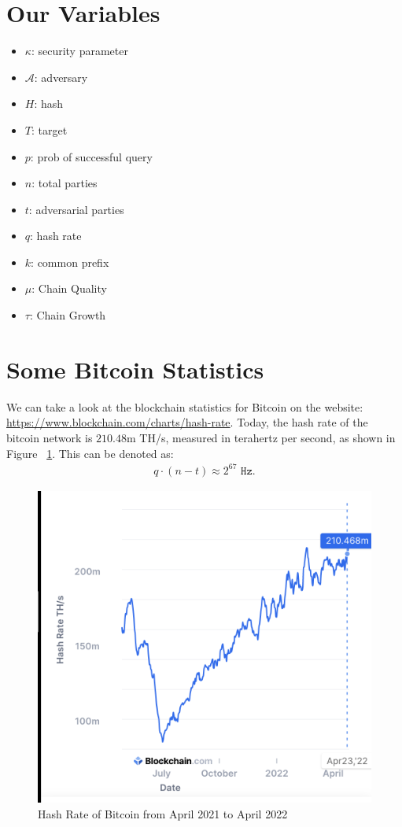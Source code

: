 \section{Our Variables}
\begin{itemize}
    \item $\kappa$: security parameter
    \item $\mathcal{A}$: adversary
    \item $H$: hash
    \item $T$: target
    \item $p$: prob of successful query
    \item $n$: total parties
    \item $t$: adversarial parties
    \item $q$: hash rate
    \item $k$: common prefix
    \item $\mu$: Chain Quality
    \item $\tau$: Chain Growth
\end{itemize}

\section{Some Bitcoin Statistics}
We can take a look at the blockchain statistics for Bitcoin on the website:\\
\href{https://www.blockchain.com/charts/hash-rate}{https://www.blockchain.com/charts/hash-rate}.
Today, the hash rate of the bitcoin network is $210.48$m TH/s, measured in terahertz per second, as shown in Figure ~\ref{fig:hash_rate}. This can be denoted as:
\begin{align*}
    q\cdot (n-t) \approx 2^{67} \texttt{ Hz}.
\end{align*}


\begin{figure}[ht]
    \centering
    \includegraphics[scale = 0.6]{figures/hash_rate.png}
    \caption{Hash Rate of Bitcoin from April 2021 to April 2022\cite{hash-rate}}
    \label{fig:hash_rate}
\end{figure}

